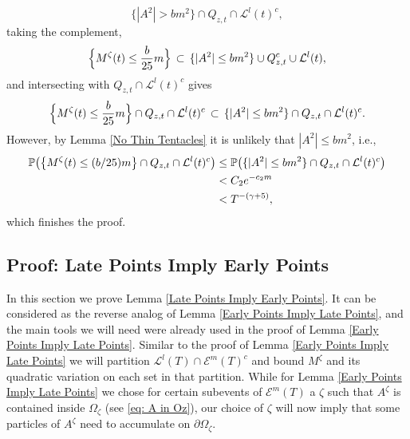 \documentclass[11pt]{article}
\makeatletter
\renewenvironment{proof}[1][\proofname]{
   \par\pushQED{\qed}\normalfont
   \topsep6\p@\@plus6\p@\relax
   \trivlist\item[\hskip\labelsep\bfseries#1\@addpunct{.}]
   \ignorespaces
}{
   \popQED\endtrivlist\@endpefalse
}
\numberwithin{equation}{section}
\def\OZ{\Omega_{\zeta}}
\def\MZT{M^{\zeta}(t)}
\def\LLT{\mathcal{L}^{l}(t)}
\makeatother
\begin{document}
\begin{proof}[Proof of Lemma \ref{Early Points Imply Late Points}]
\begin{equation}
    \{|A^2| > bm^2\} \cap Q_{z,t} \cap \LLT^c,
  \end{equation}
  taking the complement, 
  $$
  \Big{\{} \MZT \leq \frac{b}{25}m \Big{\}} 
  \, \subset \,
      \{|A^2| \leq bm^2\} \cup Q_{z,t}^c \cup \LLT,
  $$
  and intersecting with $Q_{z,t} \cap \LLT^c$ gives
  $$
  \Big{\{} \MZT \leq \frac{b}{25}m \Big{\}} 
  \cap Q_{z,t} \cap \LLT^c
  \, \subset \, \{|A^2| \leq bm^2\} \cap Q_{z,t} \cap \LLT^c.
  $$
  However, by Lemma \ref{No Thin Tentacles} it is unlikely 
  that $|A^2| \leq bm^2$, i.e.,
  \begin{align*}
    \mathbb{P} \big( 
      \big{\{} \MZT \leq (b/25)m \big{\}} 
      \cap Q_{z,t} \cap \LLT^c \big) 
    & \leq \mathbb{P} \big(
      \{|A^2| \leq bm^2\} \cap Q_{z,t} \cap \LLT^c
      \big) \\
    & < C_2 e^{-c_2 m} \\
    & < T^{-(\gamma + 5)},
  \end{align*}
  which finishes the proof.
\end{proof}

\subsection{Proof: Late Points Imply Early Points}
\label{sec: detect late points}
In this section we prove Lemma \ref{Late Points Imply Early Points}.
It can be considered as the reverse analog of Lemma 
\ref{Early Points Imply Late Points}, and 
the main tools we will need were already used 
in the proof of Lemma \ref{Early Points Imply Late Points}. 
Similar to the proof of Lemma \ref{Early Points Imply Late Points} we will 
partition $\mathcal{L}^l(T) \cap \mathcal{E}^m(T)^c$ and bound $M^{\zeta}$ 
and its quadratic variation on each set in that partition. 
While for Lemma \ref{Early Points Imply Late Points} 
we chose for certain subevents of $\mathcal{E}^m(T)$ a 
$\zeta$ such that $A^{\zeta}$ is contained inside $\OZ$ (see \eqref{eq: A in Oz}), 
our choice of $\zeta$ will now imply that 
some particles of $A^{\zeta}$ need to accumulate on $\partial \OZ$.
\end{document}
